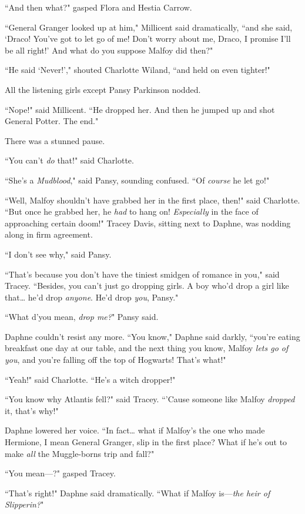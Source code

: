 ``And then what?" gasped Flora and Hestia Carrow.

``General Granger looked up at him," Millicent said dramatically, ``and she said, `Draco! You've got to let go of me! Don't worry about me, Draco, I promise I'll be all right!' And what do you suppose Malfoy did then?"

``He said `Never!'," shouted Charlotte Wiland, ``and held on even tighter!"

All the listening girls except Pansy Parkinson nodded.

``Nope!" said Millicent. ``He dropped her. And then he jumped up and shot General Potter. The end."

There was a stunned pause.

``You can't \emph{do} that!" said Charlotte.

``She's a \emph{Mudblood}," said Pansy, sounding confused. ``Of \emph{course} he let go!"

``Well, Malfoy shouldn't have grabbed her in the first place, then!" said Charlotte. ``But once he grabbed her, he \emph{had} to hang on! \emph{Especially} in the face of approaching certain doom!" Tracey Davis, sitting next to Daphne, was nodding along in firm agreement.

``I don't see why," said Pansy.

``That's because you don't have the tiniest smidgen of romance in you," said Tracey. ``Besides, you can't just go dropping girls. A boy who'd drop a girl like that{\ldots} he'd drop \emph{anyone}. He'd drop \emph{you}, Pansy."

``What d'you mean, \emph{drop me?}" Pansy said.

Daphne couldn't resist any more. ``You know," Daphne said darkly, ``you're eating breakfast one day at our table, and the next thing you know, Malfoy \emph{lets go of you}, and you're falling off the top of Hogwarts! That's what!"

``Yeah!" said Charlotte. ``He's a witch dropper!"

``You know why Atlantis fell?" said Tracey. ``'Cause someone like Malfoy \emph{dropped} it, that's why!"

Daphne lowered her voice. ``In fact{\ldots} what if Malfoy's the one who made Hermione, I mean General Granger, slip in the first place? What if he's out to make \emph{all} the Muggle-borns trip and fall?"

``You mean—?" gasped Tracey.

``That's right!" Daphne said dramatically. ``What if Malfoy is—\emph{the heir of Slipperin?}"

